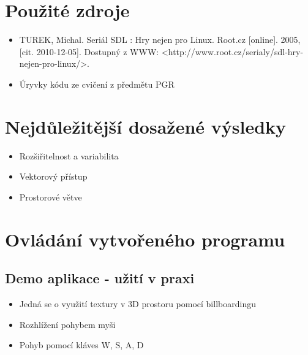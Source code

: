 \documentclass[11pt,a4paper]{article}
\begin{document}
\section{Použité zdroje}

%

\begin{itemize}
\item TUREK, Michal. Seriál SDL : Hry nejen pro Linux. Root.cz [online]. 2005, [cit. 2010-12-05]. Dostupný z WWW: {\textless}http://www.root.cz/serialy/sdl-hry-nejen-pro-linux/{\textgreater}.
\item Úryvky kódu ze cvičení z předmětu PGR
\end{itemize}

\section{Nejdůležitější dosažené výsledky}


\begin{itemize}
\item Rozšiřitelnost a variabilita
\item Vektorový přístup
\item Prostorové větve
\end{itemize}

\section{Ovládání vytvořeného programu}

%
\subsection{Demo aplikace - užití v praxi}
\begin{itemize}
\item Jedná se o využití textury v 3D prostoru pomocí billboardingu
\item Rozhlížení pohybem myši
\item Pohyb pomocí kláves W, S, A, D
\end{itemize}
\end{document}
